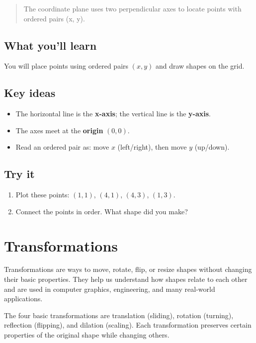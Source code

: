 \blockquote{The coordinate plane uses two perpendicular axes to locate points with
ordered pairs (x, y).}

\subsection{What you'll learn}

You will place points using ordered pairs \((x,y)\) and draw shapes on the grid.

\subsection{Key ideas}

\begin{itemize}
  \item The horizontal line is the \textbf{x-axis}; the vertical line is the \textbf{y-axis}.
  \item The axes meet at the \textbf{origin} \((0,0)\).
  \item Read an ordered pair as: move \(x\) (left/right), then move \(y\) (up/down).
\end{itemize}

\subsection{Try it}

\begin{enumerate}
  \item Plot these points: \((1,1)\), \((4,1)\), \((4,3)\), \((1,3)\).
  \item Connect the points in order. What shape did you make?
\end{enumerate}


\section{Transformations}

Transformations are ways to move, rotate, flip, or resize shapes without changing
their basic properties. They help us understand how shapes relate to each other
and are used in computer graphics, engineering, and many real-world applications.

The four basic transformations are translation (sliding), rotation (turning),
reflection (flipping), and dilation (scaling). Each transformation preserves
certain properties of the original shape while changing others.

